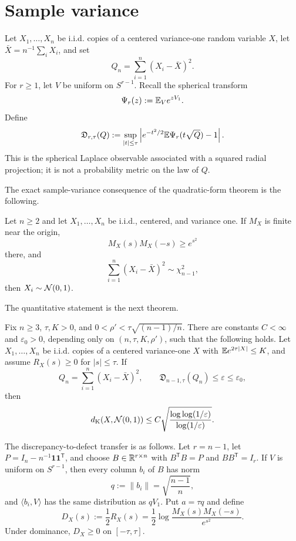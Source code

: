 \section{Sample variance}\label{sec:sample-var}

Let $X_1,\ldots,X_n$ be i.i.d. copies of a centered variance-one random variable $X$, let $\bar X=n^{-1}\sum_iX_i$, and set
\[
Q_n=\sum_{i=1}^n(X_i-\bar X)^2.
\]
For $r\ge1$, let $V$ be uniform on $S^{r-1}$. Recall the spherical transform
\[
\Psi_r(z):=\mathbb E_V e^{zV_1}.
\]
Define
\[
\mathfrak D_{r,\tau}(Q):=
\sup_{|t|\le\tau}
\left|e^{-t^2/2}\mathbb E\Psi_r(t\sqrt Q)-1\right|.
\]
This is the spherical Laplace observable associated with a squared radial projection; it is not a probability metric on the law of $Q$.

The exact sample-variance consequence of the quadratic-form theorem is the following.
\begin{corollary}\label{cor:exact-sample-var}
Let $n\ge2$ and let $X_1,\ldots,X_n$ be i.i.d., centered, and variance one. If $M_X$ is finite near the origin,
\[
M_X(s)M_X(-s)\ge e^{s^2}
\]
there, and
\[
\sum_{i=1}^n(X_i-\bar X)^2\sim\chi^2_{n-1},
\]
then $X_i\sim\mathcal N(0,1)$.
\end{corollary}

The quantitative statement is the next theorem.
\begin{theorem}\label{thm:sample-var}
Fix $n\ge3$, $\tau,K>0$, and $0<\rho'<\tau\sqrt{(n-1)/n}$. There are constants $C<\infty$ and $\varepsilon_0>0$, depending only on $(n,\tau,K,\rho')$, such that the following holds. Let $X_1,\ldots,X_n$ be i.i.d. copies of a centered variance-one $X$ with $\mathbb E e^{2\tau|X|}\le K$, and assume $R_X(s)\ge0$ for $|s|\le\tau$. If
\[
Q_n=\sum_{i=1}^n(X_i-\bar X)^2,
\qquad
\mathfrak D_{n-1,\tau}(Q_n)\le\varepsilon\le\varepsilon_0,
\]
then
\[
d_{\mathrm K}(X,\mathcal N(0,1))
\le C\sqrt{\frac{\log\log(1/\varepsilon)}{\log(1/\varepsilon)}}.
\]
\end{theorem}

The discrepancy-to-defect transfer is as follows. Let $r=n-1$, let $P=I_n-n^{-1}\mathbf1\mathbf1^{\mathsf T}$, and choose $B\in\mathbb R^{r\times n}$ with $B^{\mathsf T}B=P$ and $BB^{\mathsf T}=I_r$. If $V$ is uniform on $S^{r-1}$, then every column $b_i$ of $B$ has norm
\[
q:=\|b_i\|=\sqrt{\frac{n-1}{n}},
\]
and $\langle b_i,V\rangle$ has the same distribution as $qV_1$. Put $a=\tau q$ and define
\[
D_X(s):=\frac12R_X(s)
 =\frac12\log\frac{M_X(s)M_X(-s)}{e^{s^2}}.
\]
Under dominance, $D_X\ge0$ on $[-\tau,\tau]$.

